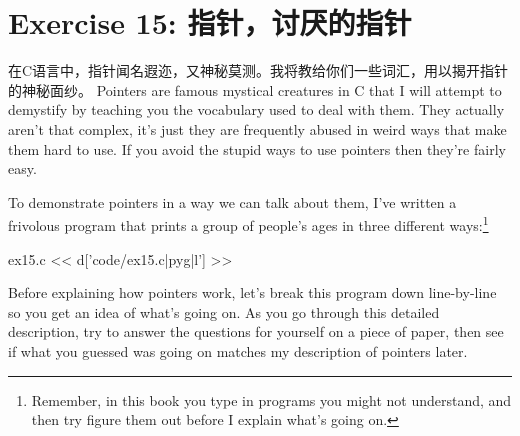 ﻿\chapter{Exercise 15: 指针，讨厌的指针}

在C语言中，指针闻名遐迩，又神秘莫测。我将教给你们一些词汇，用以揭开指针的神秘面纱。
Pointers are famous mystical creatures in C that I will attempt to
demystify by teaching you the vocabulary used to deal with them.  They
actually aren't that complex, it's just they are frequently abused
in weird ways that make them hard to use.  If you avoid the stupid
ways to use pointers then they're fairly easy.

To demonstrate pointers in a way we can talk about them, I've
written a frivolous program that prints a group of people's
ages in three different ways:\footnote{Remember, in this book you type
in programs you might not understand, and then try figure them
out before I explain what's going on.}

\begin{code}{ex15.c}
<< d['code/ex15.c|pyg|l'] >>
\end{code}

Before explaining how pointers work, let's break this program down
line-by-line so you get an idea of what's going on.  As you go
through this detailed description, try to answer the questions for 
yourself on a piece of paper, then see if what you guessed was
going on matches my description of pointers later.

